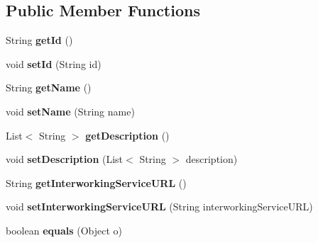 \subsection*{Public Member Functions}
\begin{DoxyCompactItemize}
\item 
\mbox{\label{classeu_1_1h2020_1_1symbiote_1_1model_1_1cim_1_1Resource_aa08ae4e12db3673a55ebe083263f422b}} 
String {\bfseries get\+Id} ()
\item 
\mbox{\label{classeu_1_1h2020_1_1symbiote_1_1model_1_1cim_1_1Resource_ad5809506d9e1d57b490a7edc63da1480}} 
void {\bfseries set\+Id} (String id)
\item 
\mbox{\label{classeu_1_1h2020_1_1symbiote_1_1model_1_1cim_1_1Resource_ab8551ec32746d164c6300c407da7e5b2}} 
String {\bfseries get\+Name} ()
\item 
\mbox{\label{classeu_1_1h2020_1_1symbiote_1_1model_1_1cim_1_1Resource_aebc3c57a9c13cc1f625bb1900b08bbbd}} 
void {\bfseries set\+Name} (String name)
\item 
\mbox{\label{classeu_1_1h2020_1_1symbiote_1_1model_1_1cim_1_1Resource_a80722497b7131f2d2d138db857d707e5}} 
List$<$ String $>$ {\bfseries get\+Description} ()
\item 
\mbox{\label{classeu_1_1h2020_1_1symbiote_1_1model_1_1cim_1_1Resource_adb3e9edf5785be1542d54f7a4a8b271c}} 
void {\bfseries set\+Description} (List$<$ String $>$ description)
\item 
\mbox{\label{classeu_1_1h2020_1_1symbiote_1_1model_1_1cim_1_1Resource_ae7b580beaaa113cf5206ea7829abed54}} 
String {\bfseries get\+Interworking\+Service\+U\+RL} ()
\item 
\mbox{\label{classeu_1_1h2020_1_1symbiote_1_1model_1_1cim_1_1Resource_a819ba0627e88a0e8debb7d1f6086a049}} 
void {\bfseries set\+Interworking\+Service\+U\+RL} (String interworking\+Service\+U\+RL)
\item 
\mbox{\label{classeu_1_1h2020_1_1symbiote_1_1model_1_1cim_1_1Resource_a4928ecbb3e9cef648ec721097864182a}} 
boolean {\bfseries equals} (Object o)
\end{DoxyCompactItemize}


